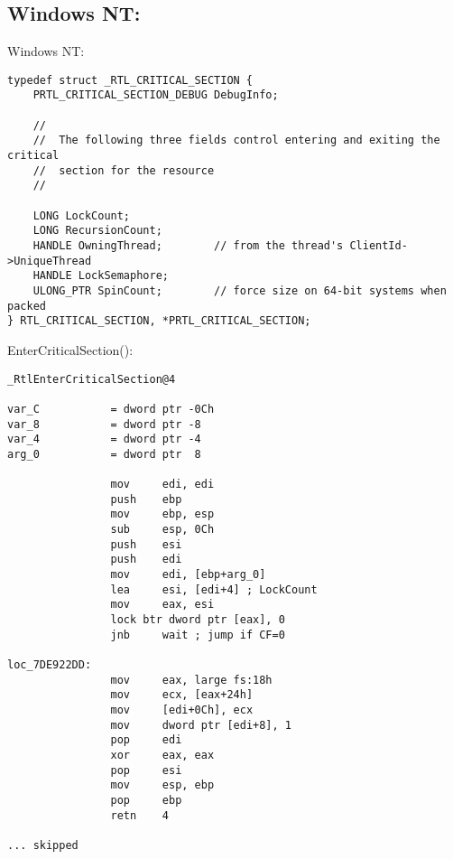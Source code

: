 \subsection{Windows NT: }

\label{critical_sections}


\par
{}  
 \gls{Windows NT}:

\begin{lstlisting}[caption=(Windows Research Kernel v1.2) public/sdk/inc/nturtl.h]
typedef struct _RTL_CRITICAL_SECTION {
    PRTL_CRITICAL_SECTION_DEBUG DebugInfo;

    //
    //  The following three fields control entering and exiting the critical
    //  section for the resource
    //

    LONG LockCount;
    LONG RecursionCount;
    HANDLE OwningThread;        // from the thread's ClientId->UniqueThread
    HANDLE LockSemaphore;
    ULONG_PTR SpinCount;        // force size on 64-bit systems when packed
} RTL_CRITICAL_SECTION, *PRTL_CRITICAL_SECTION;
\end{lstlisting}

 EnterCriticalSection():

\begin{lstlisting}[caption=Windows 2008/ntdll.dll/x86 (begin)]
_RtlEnterCriticalSection@4

var_C           = dword ptr -0Ch
var_8           = dword ptr -8
var_4           = dword ptr -4
arg_0           = dword ptr  8

                mov     edi, edi
                push    ebp
                mov     ebp, esp
                sub     esp, 0Ch
                push    esi
                push    edi
                mov     edi, [ebp+arg_0]
                lea     esi, [edi+4] ; LockCount
                mov     eax, esi
                lock btr dword ptr [eax], 0
                jnb     wait ; jump if CF=0

loc_7DE922DD:
                mov     eax, large fs:18h
                mov     ecx, [eax+24h]
                mov     [edi+0Ch], ecx
                mov     dword ptr [edi+8], 1
                pop     edi
                xor     eax, eax
                pop     esi
                mov     esp, ebp
                pop     ebp
                retn    4

... skipped
\end{lstlisting}

